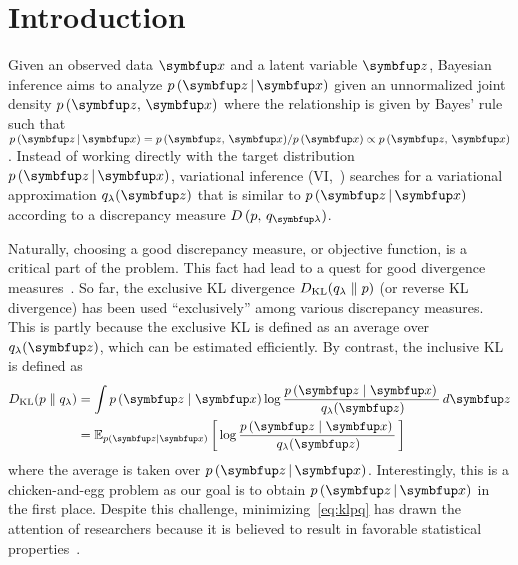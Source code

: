 
\section{Introduction}
Given an observed data \(\vx\) and a latent variable \(\vz\), Bayesian inference aims to analyze \(p\,(\vz\,|\,\vx)\) given an unnormalized joint density \(p\,(\vz,\,\vx)\) where the relationship is given by Bayes' rule such that \(p\,(\vz\,|\,\vx) = {p\,(\vz,\,\vx)}/{p\,(\vx)} \propto p\,(\vz,\,\vx)\).
Instead of working directly with the target distribution \(p\,(\vz\,|\,\vx)\), variational inference (VI,~\citealt{jordan_introduction_1999, blei_variational_2017, zhang_advances_2019}) searches for a variational approximation \(q_{\lambda}(\vz)\) that is similar to \(p\,(\vz\,|\,\vx)\) according to a discrepancy measure \(D\,(p,\, q_{\vlambda})\).

Naturally, choosing a good discrepancy measure, or objective function, is a critical part of the problem.
This fact had lead to a quest for good divergence measures~\citep{pmlr-v37-salimans15, NIPS2016_7750ca35, NIPS2017_35464c84, NEURIPS2018_1cd138d0, pmlr-v97-ruiz19a}.
So far, the exclusive KL divergence \(D_{\mathrm{KL}}(q_{\lambda}\parallel p)\) (or reverse KL divergence) has been used ``exclusively'' among various discrepancy measures.
This is partly because the exclusive KL is defined as an average over \(q_{\lambda}(\vz)\), which can be estimated efficiently.
By contrast, the inclusive KL is defined as
%
\begin{align}
  \DKL{p}{q_{\lambda}}
  &= \int p\,(\vz\mid\vx) \log \frac{p\,(\vz\mid\vx)\,}{\,q_{\lambda}(\vz)} \,d\vz \\
  &= \Esub{p(\vz\mid\vx)}{\log \frac{p\,(\vz\mid\vx)\,}{\,q_{\lambda}(\vz)} } \label{eq:klpq}
\end{align}
%
\noindent where the average is taken over \(p\,(\vz\,|\,\vx)\). 
Interestingly, this is a chicken-and-egg problem as our goal is to obtain \(p\,(\vz\,|\,\vx)\) in the first place.
Despite this challenge, minimizing~\eqref{eq:klpq} has drawn the attention of researchers because it is believed to result in favorable statistical properties~\citep{minka2005divergence, mackay_local_2001}.

